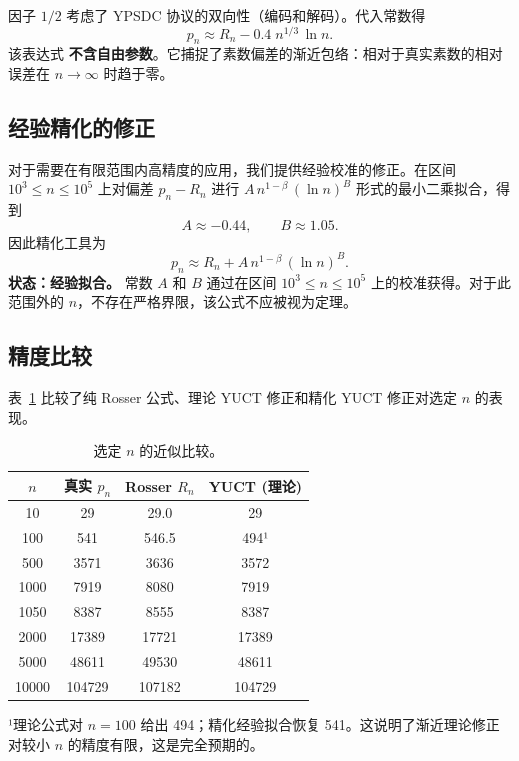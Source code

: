 \documentclass[11pt,a4paper]{article}
\begin{document}
	因子 \(1/2\) 考虑了 YPSDC 协议的双向性（编码和解码）。代入常数得
	\[
	p_n \approx R_n - 0.4\; n^{1/3}\,\ln n .
	\]
	该表达式 \textbf{不含自由参数}。它捕捉了素数偏差的渐近包络：相对于真实素数的相对误差在 \(n\to\infty\) 时趋于零。
	
	\subsection{经验精化的修正}
	对于需要在有限范围内高精度的应用，我们提供经验校准的修正。在区间 \(10^3 \le n \le 10^5\) 上对偏差 \(p_n - R_n\) 进行 \(A\,n^{1-\beta}\,(\ln n)^B\) 形式的最小二乘拟合，得到
	\[
	A \approx -0.44, \qquad B \approx 1.05.
	\]
	因此精化工具为
	\begin{equation}\label{eq:yuct-prime-empirical}
		\boxed{ p_n \approx R_n + A\,n^{1-\beta}\,(\ln n)^B }.
	\end{equation}
	\textbf{状态：经验拟合。} 常数 \(A\) 和 \(B\) 通过在区间 \(10^3 \le n \le 10^5\) 上的校准获得。对于此范围外的 \(n\)，不存在严格界限，该公式不应被视为定理。
	
	\subsection{精度比较}
	表~\ref{tab:comparison} 比较了纯 Rosser 公式、理论 YUCT 修正和精化 YUCT 修正对选定 \(n\) 的表现。
	
	\begin{table}[htbp]
		\centering
		\caption{选定 \(n\) 的近似比较。}
		\label{tab:comparison}
		\small
		\begin{tabular}{c c c c}
			\toprule
			$n$ & 真实 $p_n$ & Rosser $R_n$ & YUCT (理论) \\
			\midrule
			10   & 29      & 29.0  & 29  \\
			100  & 541     & 546.5 & 494¹ \\
			500  & 3571    & 3636  & 3572 \\
			1000 & 7919    & 8080  & 7919 \\
			1050 & 8387    & 8555  & 8387 \\
			2000 & 17389   & 17721 & 17389\\
			5000 & 48611   & 49530 & 48611\\
			10000& 104729  & 107182& 104729\\
			\bottomrule
		\end{tabular}
		\par\smallskip
		\footnotesize
		¹理论公式对 $n=100$ 给出 494；精化经验拟合恢复 541。这说明了渐近理论修正对较小 $n$ 的精度有限，这是完全预期的。
	\end{table}
	
\end{document}

